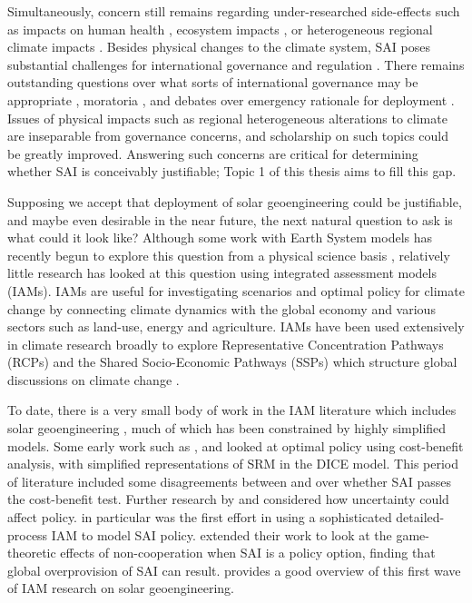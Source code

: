 \documentclass{article}
\begin{document}
Simultaneously, concern still remains regarding under-researched side-effects such as impacts on human health \citep{eastham2018quantifying}, ecosystem impacts \citep{Zarnetske2021}, or heterogeneous regional climate impacts \citep{jones2018regional,kravitz2014multi}. Besides physical changes to the climate system, SAI poses substantial challenges for international governance and regulation \citep{reynolds2019solar}. There remains outstanding questions over what sorts of international governance may be appropriate \citep{bodansky2013and,barrett2014solar}, moratoria \citep{herzog2016moratoria}, and debates over emergency rationale for deployment \citep{Lenton2018TippingGeo,sillmann2015climate,horton2015emergency,Corbett2021}. Issues of physical impacts such as regional heterogeneous alterations to climate are inseparable from governance concerns, and scholarship on such topics could be greatly improved. Answering such concerns are critical for determining whether SAI is conceivably justifiable; Topic 1 of this thesis aims to fill this gap. \medskip

Supposing we accept that deployment of solar geoengineering could be justifiable, and maybe even desirable in the near future, the next natural question to ask is what could it look like? Although some work with Earth System models has recently begun to explore this question from a physical science basis \citep{irvine2020halving,macmartin2018solar}, relatively little research has looked at this question using integrated assessment models (IAMs). IAMs are useful for investigating scenarios and optimal policy for climate change by connecting climate dynamics with the global economy and various sectors such as land-use, energy and agriculture. IAMs have been used extensively in climate research broadly to explore Representative Concentration Pathways (RCPs) and the Shared Socio-Economic Pathways (SSPs) which structure global discussions on climate change \citep{weyant2017some, intergovernmental2018global,kriegler2012need}. \medskip

To date, there is a very small body of work in the IAM literature which includes solar geoengineering \citep{heutel2016climate}, much of which has been constrained by highly simplified models. Some early work such as \citet{lane2009solar}, \citet{goes2011economics} and \citet{moreno2012simple} looked at optimal policy using cost-benefit analysis, with simplified representations of SRM in the DICE model. This period of literature included some disagreements between \citet{bickel2013reexamining} and \citet{goes2011economics} over whether SAI passes the cost-benefit test. Further research by \citet{emmerling2013geoengineering} and \citet{moreno2013climate} considered how uncertainty could affect policy. \citet{emmerling2013geoengineering} in particular was the first effort in using a sophisticated detailed-process IAM to model SAI policy. \citet{emmerling2018exploration} extended their work to look at the game-theoretic effects of non-cooperation when SAI is a policy option, finding that global overprovision of SAI can result. \citet{heutel2016climate} provides a good overview of this first wave of IAM research on solar geoengineering. \medskip 
\end{document}
